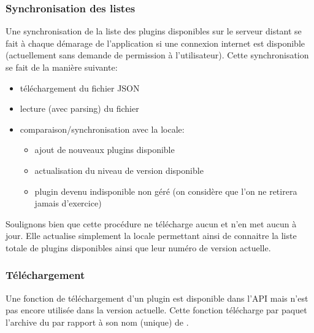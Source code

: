 \subsubsection{Synchronisation des listes}
Une synchronisation de la liste des plugins disponibles sur le serveur distant se fait à chaque démarage de l'application si une connexion internet est disponible (actuellement sans demande de permission à l'utilisateur).
Cette synchronisation se fait de la manière suivante:
\begin{itemize}
    \item téléchargement du fichier JSON
    \item lecture (avec parsing) du fichier
    \item comparaison/synchronisation avec la \bdd{} locale:
    \begin{itemize}
        \item ajout de nouveaux plugins disponible
        \item actualisation du niveau de version disponible
        \item plugin devenu indisponible non géré (on considère que l'on ne retirera jamais d'exercice)
    \end{itemize}
\end{itemize}
Soulignons bien que cette procédure ne télécharge aucun \plugin{} et n'en met aucun à jour. Elle actualise simplement la \bdd{} locale permettant ainsi de connaitre la liste totale de plugins disponibles ainsi que leur numéro de version actuelle.

\subsubsection{Téléchargement}
\label{importation_plugin-telechargement}
Une fonction de téléchargement d'un plugin est disponible dans l'API mais n'est pas encore utilisée dans la version actuelle. Cette fonction télécharge par paquet l'archive du \plugin{} par rapport à son nom (unique) de \plugin{}.

